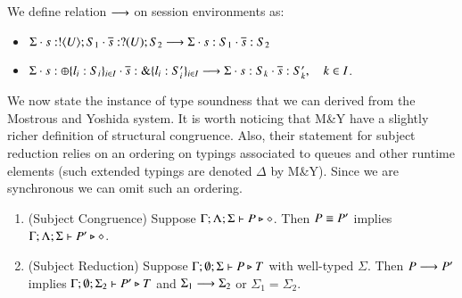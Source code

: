 \begin{definition}
	We define relation $\longrightarrow$ on session environments as:
	\begin{itemize}
		\item	$\Sigma \cdot s: ! \langle U \rangle ; S_1 \cdot \overline{s}: ? (U) ; S_2 \longrightarrow \Sigma \cdot s: S_1 \cdot \overline{s}: S_2$
		\item	$\Sigma \cdot s: \oplus \{l_i: S_i\}_{i \in I} \cdot \overline{s}: \& \{l_i: S_i'\}_{i \in I} \longrightarrow \Sigma \cdot s: S_k \cdot \overline{s}: S_k', \quad k \in I$.
	\end{itemize}
\end{definition}

We now state the instance of type soundness that we can derived from the Mostrous and Yoshida system.
It is worth noticing that M\&Y have a slightly richer definition of structural congruence.
Also, their statement for subject reduction relies on an ordering on typings associated to queues and other 
runtime elements (such extended typings are denoted $\Delta$ by M\&Y).
Since we are synchronous we can omit such an ordering.

\begin{theorem}
	\begin{enumerate}[1.]
		\item	(Subject Congruence) Suppose $\Gamma; \Lambda; \Sigma \vdash P \triangleright \diamond$.
			Then $P \equiv P'$ implies $\Gamma; \Lambda; \Sigma \vdash P' \triangleright \diamond$.

		\item	(Subject Reduction) Suppose $\Gamma; \emptyset; \Sigma \vdash P \triangleright T$
			with
			well-typed $\Sigma$.
			Then $P \longrightarrow P'$ implies $\Gamma; \emptyset; \Sigma_2  \vdash P' \triangleright T$
			and $\Sigma_1 \longrightarrow \Sigma_2$ or $\Sigma_1 = \Sigma_2$.
	\end{enumerate}
\end{theorem}


